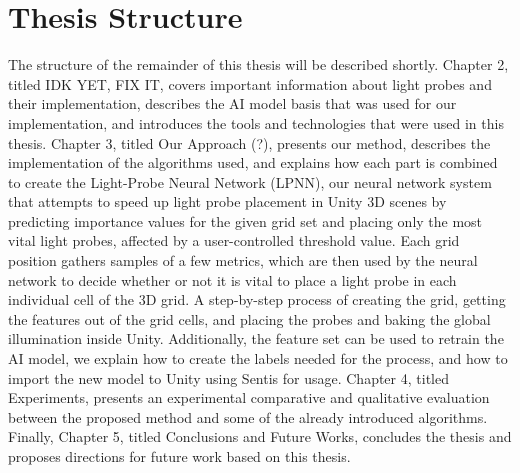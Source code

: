 \section{Thesis Structure} %
The structure of the remainder of this thesis will be described shortly. Chapter 2, titled IDK YET, FIX IT, covers important information about light probes and their implementation, describes the AI model basis that was used for our implementation, and introduces the tools and technologies that were used in this thesis. Chapter 3, titled Our Approach (?), presents our method, describes the implementation of the algorithms used, and explains how each part is combined to create the Light-Probe Neural Network (LPNN), our neural network system that attempts to speed up light probe placement in Unity 3D scenes by predicting importance values for the given grid set and placing only the most vital light probes, affected by a user-controlled threshold value. Each grid position gathers samples of a few metrics, which are then used by the neural network to decide whether or not it is vital to place a light probe in each individual cell of the 3D grid. A step-by-step process of creating the grid, getting the features out of the grid cells, and placing the probes and baking the global illumination inside Unity. Additionally, the feature set can be used to retrain the AI model, we explain how to create the labels needed for the process, and how to import the new model to Unity using Sentis for usage. Chapter 4, titled Experiments, presents an experimental comparative and qualitative evaluation between the proposed method and some of the already introduced algorithms. Finally, Chapter 5, titled Conclusions and Future Works, concludes the thesis and proposes directions for future work based on this thesis.












